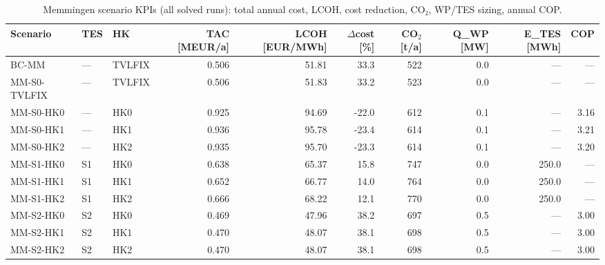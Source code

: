 \begin{table}[htbp]
  \centering
  \caption{Memmingen scenario KPIs (all solved runs): total annual cost, LCOH, cost reduction, CO₂, WP/TES sizing, annual COP.}
  \label{tab:tab_T4_memmingen_kpis}
  \begin{tabular}{ll lrrrrrrr}
  \toprule
  Scenario & TES & HK & TAC [MEUR/a] & LCOH [EUR/MWh] & $\Delta$cost [\%] & CO$_2$ [t/a] & Q\_WP [MW] & E\_TES [MWh] & COP \\
  \midrule
  BC-MM & — & TVLFIX & 0.506 & 51.81 & 33.3 & 522 & 0.0 & — & — \\
  MM-S0-TVLFIX & — & TVLFIX & 0.506 & 51.83 & 33.2 & 523 & 0.0 & — & — \\
  MM-S0-HK0 & — & HK0 & 0.925 & 94.69 & -22.0 & 612 & 0.1 & — & 3.16 \\
  MM-S0-HK1 & — & HK1 & 0.936 & 95.78 & -23.4 & 614 & 0.1 & — & 3.21 \\
  MM-S0-HK2 & — & HK2 & 0.935 & 95.70 & -23.3 & 614 & 0.1 & — & 3.20 \\
  MM-S1-HK0 & S1 & HK0 & 0.638 & 65.37 & 15.8 & 747 & 0.0 & 250.0 & — \\
  MM-S1-HK1 & S1 & HK1 & 0.652 & 66.77 & 14.0 & 764 & 0.0 & 250.0 & — \\
  MM-S1-HK2 & S1 & HK2 & 0.666 & 68.22 & 12.1 & 770 & 0.0 & 250.0 & — \\
  MM-S2-HK0 & S2 & HK0 & 0.469 & 47.96 & 38.2 & 697 & 0.5 & — & 3.00 \\
  MM-S2-HK1 & S2 & HK1 & 0.470 & 48.07 & 38.1 & 698 & 0.5 & — & 3.00 \\
  MM-S2-HK2 & S2 & HK2 & 0.470 & 48.07 & 38.1 & 698 & 0.5 & — & 3.00 \\
  \bottomrule
  \end{tabular}
\end{table}
